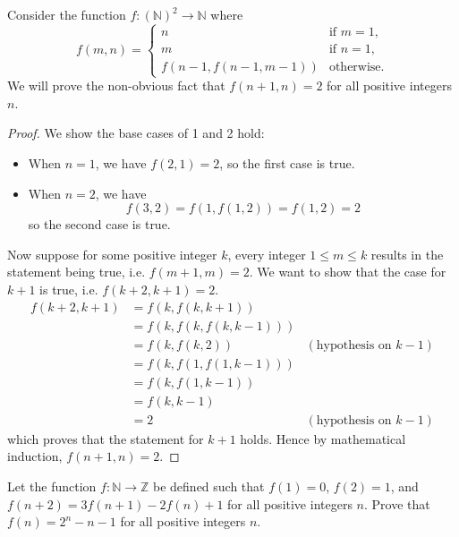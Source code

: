 \begin{example}\label{example-strong-induction-on-function}
    Consider the function $f: \left(\mathbb{N}\right)^2\to\mathbb{N}$ where
    \[
        f(m, n) =
        \begin{cases}
            n & \text{if } m = 1, \\
            m & \text{if } n = 1, \\
            f\left(n-1,f(n-1,m-1)\right) & \text{otherwise.}
        \end{cases}
    \]
    We will prove the non-obvious fact that $f(n+1, n) = 2$ for all positive integers $n$.
    \begin{proof}
        We show the base cases of 1 and 2 hold:
        \begin{itemize}
            \item When $n = 1$, we have $f(2, 1) = 2$, so the first case is true.
            \item When $n = 2$, we have
            \[
                f(3,2) = f(1, f(1, 2)) = f(1, 2) = 2
            \]
            so the second case is true.
        \end{itemize}

        Now suppose for some positive integer $k$, every integer $1 \leq m \leq k$ results in the statement being true, i.e. $f(m+1,m) = 2$. We want to show that the case for $k+1$ is true, i.e. $f(k+2, k+1) = 2$.
        \begin{align*}
            f(k+2, k+1) &= f(k, f(k, k+1))\\
            &= f(k, f(k, f(k, k-1)))\\
            &= f(k, f(k, 2)) & (\text{hypothesis on } k-1)\\
            &= f(k, f(1, f(1, k-1)))\\
            &= f(k, f(1, k-1))\\
            &= f(k, k-1) \\
            &= 2 & (\text{hypothesis on } k-1)
        \end{align*}
        which proves that the statement for $k+1$ holds. Hence by mathematical induction, $f(n+1, n) = 2$.
    \end{proof}
\end{example}

\begin{exercise}
    Let the function $f: \mathbb{N} \to \mathbb{Z}$ be defined such that $f(1) = 0$, $f(2) = 1$, and $f(n+2) = 3f(n+1) - 2f(n) + 1$ for all positive integers $n$. Prove that $f(n) = 2^n - n - 1$ for all positive integers $n$.
\end{exercise}

